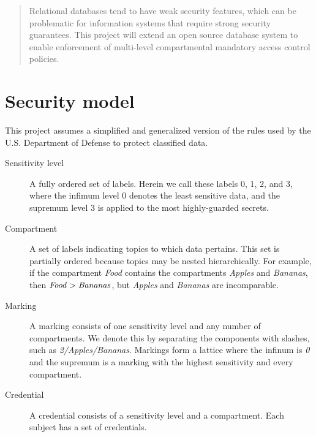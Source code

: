 \documentclass{article}
\begin{document}
\maketitle

\begin{abstract}
Relational databases tend to have weak security features, which can be
problematic for information systems that require strong security guarantees.
This project will extend an open source database system to enable enforcement
of multi-level compartmental mandatory access control policies.

\end{abstract}

\section{Security model}

This project assumes a simplified and generalized version of the rules
used by the U.S. Department of Defense to protect classified data.

\begin{description}

  \item[Sensitivity level] A fully ordered set of labels. Herein we call
    these labels $0$, $1$, $2$, and $3$, where the infimum level
    $0$ denotes the least sensitive data, and the supremum level $3$
    is applied to the most highly-guarded secrets.

  \item[Compartment] A set of labels indicating topics to which data
    pertains. This set is partially ordered because topics may be nested
    hierarchically. For example, if the compartment {\it Food} contains
    the compartments {\it Apples} and {\it Bananas}, then
    ${\it Food} > {\it Bananas}$, but {\it Apples} and {\it Bananas}
    are incomparable.

  \item[Marking] A marking consists of one sensitivity level and any
    number of compartments. We denote this by separating the components
    with slashes, such as {\it 2/Apples/Bananas}. Markings form a lattice
    where the infinum is {\it 0} and the supremum is a marking with the
    highest sensitivity and every compartment.

  \item[Credential] A credential consists of a sensitivity level and
    a compartment. Each subject has a set of credentials.

\end{description}
\end{document}
